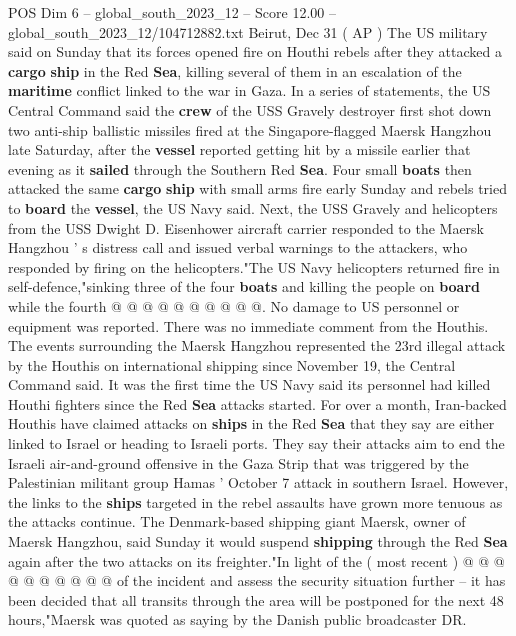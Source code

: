 \begin{textsample}{POS Dim 6 – global\_south\_2023\_12 – Score 12.00 – global\_south\_2023\_12/104712882.txt}  \label{ex:f6_pos_101}
Beirut, Dec 31 ( AP ) The US military said on Sunday that its forces opened fire on Houthi rebels after they attacked a \textbf{cargo} \textbf{ship} in the Red \textbf{Sea}, killing several of them in an escalation of the \textbf{maritime} conflict linked to the war in Gaza.
In a series of statements, the US Central Command said the \textbf{crew} of the USS Gravely destroyer first shot down two anti-ship ballistic missiles fired at the Singapore-flagged Maersk Hangzhou late Saturday, after the \textbf{vessel} reported getting hit by a missile earlier that evening as it \textbf{sailed} through the Southern Red \textbf{Sea}.
Four small \textbf{boats} then attacked the same \textbf{cargo} \textbf{ship} with small arms fire early Sunday and rebels tried to \textbf{board} the \textbf{vessel}, the US Navy said.
Next, the USS Gravely and helicopters from the USS Dwight D.
Eisenhower aircraft carrier responded to the Maersk Hangzhou ' s distress call and issued verbal warnings to the attackers, who responded by firing on the helicopters."The US Navy helicopters returned fire in self-defence,"sinking three of the four \textbf{boats} and killing the people on \textbf{board} while the fourth @ @ @ @ @ @ @ @ @ @.
No damage to US personnel or equipment was reported.
There was no immediate comment from the Houthis.
The events surrounding the Maersk Hangzhou represented the 23rd illegal attack by the Houthis on international shipping since November 19, the Central Command said.
It was the first time the US Navy said its personnel had killed Houthi fighters since the Red \textbf{Sea} attacks started.
For over a month, Iran-backed Houthis have claimed attacks on \textbf{ships} in the Red \textbf{Sea} that they say are either linked to Israel or heading to Israeli ports.
They say their attacks aim to end the Israeli air-and-ground offensive in the Gaza Strip that was triggered by the Palestinian militant group Hamas ' October 7 attack in southern Israel.
However, the links to the \textbf{ships} targeted in the rebel assaults have grown more tenuous as the attacks continue.
The Denmark-based shipping giant Maersk, owner of Maersk Hangzhou, said Sunday it would suspend \textbf{shipping} through the Red \textbf{Sea} again after the two attacks on its freighter."In light of the ( most recent ) @ @ @ @ @ @ @ @ @ @ of the incident and assess the security situation further -- it has been decided that all transits through the area will be postponed for the next 48 hours,"Maersk was quoted as saying by the Danish public broadcaster DR.

\end{textsample}
